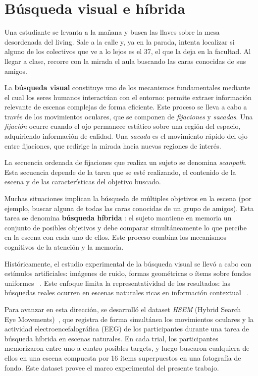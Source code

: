 \section{Búsqueda visual e híbrida}
\label{sec:busqueda_visual}


Una estudiante se levanta a la mañana y busca las llaves sobre la mesa desordenada del living. 
Sale a la calle y, ya en la parada, intenta localizar si alguno de los colectivos que ve a lo lejos es el 37,
el que la deja en la facultad. Al llegar a clase, recorre con la mirada el aula 
buscando las caras conocidas de sus amigos.

La \textbf{búsqueda visual} constituye uno de los mecanismos fundamentales mediante el cual los seres humanos 
interactúan con el entorno: permite extraer información relevante de escenas complejas de 
forma eficiente. Este proceso se lleva a cabo a través de los movimientos oculares, 
que se componen de \textit{fijaciones} y \textit{sacadas}. Una \textit{fijación} ocurre cuando el ojo permanece estático sobre una región del espacio,
adquiriendo información de calidad. Una \textit{sacada} es el movimiento rápido del ojo entre fijaciones, que redirige la mirada hacia nuevas regiones de interés.

La secuencia ordenada de fijaciones que realiza un sujeto se denomina \textit{scanpath}. Esta secuencia depende de la tarea que
se esté realizando, el contenido de la escena y de las características del objetivo buscado.

Muchas situaciones implican la búsqueda de múltiples objetivos en la escena (por ejemplo, buscar alguna de todas las caras conocidas de un grupo de amigos). Esta tarea se denomina \textbf{búsqueda híbrida} \citep{wolfe2012saved}: el sujeto mantiene en memoria un conjunto de posibles objetivos y debe comparar simultáneamente lo que percibe en la escena con cada uno de ellos. Este proceso combina los mecanismos cognitivos de la atención y la memoria.

Históricamente, el estudio experimental de la búsqueda visual se llevó a cabo con estímulos artificiales: imágenes de ruido, formas geométricas o ítems sobre fondos uniformes ~\citep{bujia2022}. Este enfoque limita la representatividad de los resultados: las búsquedas reales ocurren en escenas naturales ricas en información contextual ~\citep{travi2022visions}.

Para avanzar en esta dirección, se desarrolló el dataset \textit{HSEM} (Hybrid Search Eye Movements)~\citep{ruarte2025}, que registra de forma simultánea los movimientos oculares y la actividad electroencefalográfica (EEG) de los participantes durante una tarea de búsqueda híbrida en escenas naturales. En cada trial, los participantes memorizaron entre uno a cuatro posibles targets, y luego buscaron cualquiera de ellos en una escena compuesta por 16 ítems superpuestos en una fotografía de fondo. Este dataset provee el marco experimental del presente trabajo.